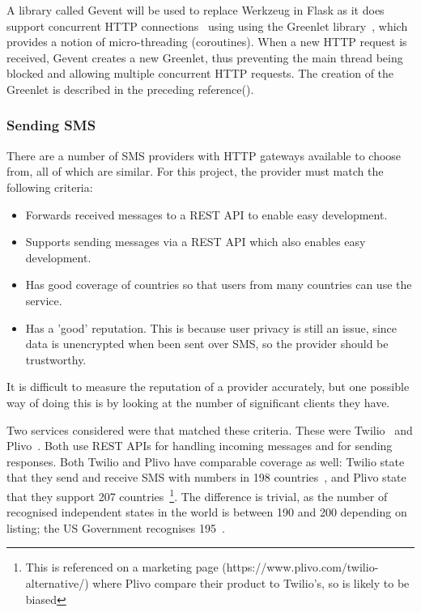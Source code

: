 \documentclass[authoryearcitations]{UoYCSproject}
\begin{document}
A library called Gevent will be used to replace Werkzeug in Flask as it does support concurrent HTTP connections~\cite{geventImplementingServers} using using the Greenlet library~\cite{libraryGreenlet}, which provides a notion of micro-threading (coroutines). When a new HTTP request is received, Gevent creates a new Greenlet, thus preventing the main thread being blocked and allowing multiple concurrent HTTP requests. The creation of the Greenlet is described in the preceding reference(\cite{geventImplementingServers}). 

\subsubsection{Sending SMS}
There are a number of SMS providers with HTTP gateways available to choose from, all of which are similar. For this project, the provider must match the following criteria:
\begin{itemize}
  \item Forwards received messages to a REST API to enable easy development.
  \item Supports sending messages via a REST API which also enables easy development.
  \item Has good coverage of countries so that users from many countries can use the service.
  \item Has a 'good' reputation. This is because user privacy is still an issue, since data is unencrypted when been sent over SMS, so the provider should be trustworthy.
\end{itemize}

It is difficult to measure the reputation of a provider accurately, but one possible way of doing this is by looking at the number of significant clients they have.

Two services considered were that matched these criteria.  These were Twilio~\cite{serviceTwilio} and Plivo~\cite{servicePlivo}. Both use REST APIs for handling incoming messages and for sending responses. Both Twilio and Plivo have comparable coverage as well: Twilio state that they send and receive SMS with numbers in 198 countries~\cite{twilioCoverage}, and Plivo state that they support 207 countries~\cite{plivoCoverage}\footnote{This is referenced on a marketing page (https://www.plivo.com/twilio-alternative/) where Plivo compare their product to Twilio's, so is likely to be biased}. The difference is trivial, as the number of recognised independent states in the world is between 190 and 200 depending on listing; the US Government recognises 195~\cite{usStateDepartmentListOfIndependentStates}.
\end{document}
